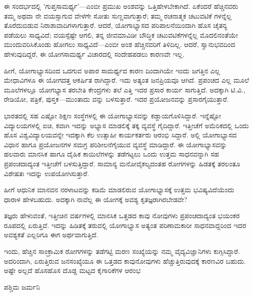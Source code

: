 ಈ ಸಂದರ್ಭದಲ್ಲಿ 'ಗುಪ್ತಸಾಮರ್ಥ್ಯ'—ಎಂಬೀ ಪ್ರಮುಖ ಅಂಶವನ್ನು ಒತ್ತಿಹೇಳಬೇಕಾಗಿದೆ. ಏಕೆಂದರೆ ಹೆಚ್ಚಿನವರು ತಮ್ಮ  ಅಥವಾ  ನೇ ವಯಸ್ಸಾಗುವ ವೇಳೆಗೇ ಸೋತು ಸುಣ್ಣವಾಗುತ್ತಾರೆ; ತಮ್ಮ ರಚನಾತ್ಮಕ ಚಟುವಟಿಕೆ ಗಳನ್ನೆಲ್ಲ ತೊರೆದುಬಿಡುವ ನಿರಾಶಾವಾದಿಗಳಾಗುತ್ತಾರೆ. ಆದರೆ, ಯೋಗಾಭ್ಯಾಸದ ಪರಿಪಾಲನೆಯಿಂದಾಗಿ ಹೊಸ ಚೈತನ್ಯ ಪಡೆಯಲು ಸಾಧ್ಯವಿದೆ; ವಯಸ್ಸೆಷ್ಟೇ ಆಗಲಿ, ತನ್ನ ಜೀವಮಾವಿಡೀ ಬೌದ್ಧಿಕ ಚಟುವಟಿಕೆಗಳನ್ನೆಲ್ಲ ಮೊದಲಿನಂತೆಯೇ ಮುಂದುವರಿಸಿಕೊಂಡು ಹೋಗಲು ಸಾಧ್ಯವಿದೆ—ಎಂಬೀ ಅಂಶ ಹೆಚ್ಚಿನವರಿಗೆ ತಿಳಿದಿಲ್ಲ. ಆದರೆ, ಸ್ವಾನುಭವದಿಂದ ಹೇಳುವುದಿದ್ದರೆ, ಈ ಯೋಗಸಾಮರ್ಥ್ಯ ವಿಚಾರದಲ್ಲಿ ಸಂದೇಹಪಡಲು ಕಾರಣವೇ ಇಲ್ಲ.

ಹೀಗೆ, ಯೋಗಾಭ್ಯಾಸದಿಂದ ಒದಗುವ ಅಪಾರ ಸಾಮರ್ಥ್ಯದ ಕಾರಣ ದಿಂದಾಗಿಯೇ ಇಂದು ಜಗತ್ತಿನ ಎಲ್ಲ ಮೇಧಾವಿಗಳೂ ಈ ಯೋಗದತ್ತ ಆಕರ್ಷಿತ ರಾಗಿದ್ದಾರೆ. ಇದು ಅತ್ಯಂತ ಜನಪ್ರಿಯವೂ ಆಗಿದೆ. ಪ್ರಪಂಚದ ಎಲ್ಲ ಮೂಲೆ ಮೂಲೆಗಳಲ್ಲೂ ಯೋಗಭ್ಯಾಸ ತರಬೇತಿ ಕೇಂದ್ರಗಳು ತಲೆ ಎತ್ತಿ ಇದರ ಪ್ರಸಾರ ಕಾರ್ಯ ಸಾಗುತ್ತಿದೆ. ಅದಕ್ಕಾಗಿ ಟಿ.ವಿ., ರೇಡಿಯೋ, ಪತ್ರಿಕೆ, ಪುಸ್ತಕ—ಮುಂತಾದು ವನ್ನು ಬಳಸುತ್ತಾರೆ. ಇದರ ಪ್ರಯೋಜನವನ್ನು ಪ್ರಸಾರಗೈಯುತ್ತಾರೆ.

ಭಾರತದಲ್ಲಿ ಸಹ ಎಷ್ಟೋ ಶಿಕ್ಷಣ ಸಂಸ್ಥೆಗಳಲ್ಲಿ ಈ ಯೋಗಾಭ್ಯಾಸವನ್ನು ಕಡ್ಡಾಯಗೊಳಿಸಿದ್ದಾರೆ. ಇನ್ನೆಷ್ಟೋ ವಿದ್ಯಾಲಯಗಳಲ್ಲಿ ಐಚಿ, ಕವಾಗಿ ಇದನ್ನು ಅಭ್ಯಾಸ ಮಾಡಲಿಕ್ಕೆ ತಕ್ಕ ವ್ಯವಸ್ಥೆ ಗೈದಿದ್ದಾರೆ. ಇತ್ತೀಚೆಗೆ ಅಮೆರಿಕದಲ್ಲಿ ಒಂದು ಹೊಸ ವಿಶ್ವವಿದ್ಯಾಲಯವನ್ನೇ ಇದಕ್ಕಾಗಿ ಕೆಲ ಉತ್ಸಾಹೀ ಕಾರ್ಯಕರ್ತರು ಆರಂಭಿ ಸಿದ್ದಾರೆ. ಅಲ್ಲಿ ಯೋಗಾಭ್ಯಾಸದ ವಿಧಾನ ಹಾಗೂ ಪ್ರಯೋಜನಗಳ ಸಮಗ್ರ ಪರಿಶೀಲನೆಗೈಯುವ ವ್ಯವಸ್ಥೆ ಮಾಡಿದ್ದಾರೆ. ಈ ಯೋಗಾಭ್ಯಾಸವನ್ನು ಹಲವಾರು ಮಾನಸಿಕ ಹಾಗೂ ದೈಹಿಕ ಕಾಯಿಲೆಗಳನ್ನು ತಡೆಗಟ್ಟಲು ಒಂದು ಉತ್ತಮ ಸಾಧನವನ್ನಾಗಿ ಸಹ ಪ್ರಪಂಚದಾದ್ಯಂತ ಇತ್ತೀಚೆಗೆ ಬಳಸುತ್ತಿದ್ದಾರೆ. ಸಾಮಾನ್ಯ ಮನೋವೈಕಲ್ಯದಂತಹ  ರೋಗಗಳನ್ನು ಹಿಡತಕ್ಕೆ ತರಲಂತೂ ವಿಶೇಷತಃ ಇದನ್ನು ಉಪಯೋಗಿಸುತ್ತಾರೆ.

ಹೀಗೆ ಆಧುನಿಕ ಮಾನವನ ನರಳಾಟವನ್ನು ಕಡಿಮೆ ಮಾಡಲಿರುವ ಯೋಗಾಭ್ಯಾಸಕ್ಕೆ ಉತ್ತಮ ಭವಿಷ್ಯವಿದೆಯೆಂದು ಧಾರಾಳ ಹೇಳಬಹುದು. ಅದಕ್ಕಾಗಿ ನಾವೆಲ್ಲ ಈ ಯೋಗಕ್ಕೆ ಅವಶ್ಯ ಕೃತಜ್ಞರಾಗಿರಬೇಡವೇ?

ತಜ್ಞರು ಹೇಳುವಂತೆ, ಇತ್ತೀಚಿನ ವರ್ಷಗಳಲ್ಲಿ ಮಾನಸಿಕ ಒತ್ತಡದ ಕಾವು ನೋವುಗಳು ಪ್ರಪಂಚದಾದ್ಯಂತ ಭಯಂಕರ ರೂಪದಲ್ಲಿ ಏರುತ್ತಿವೆ. ಇದನ್ನು ಹಿಡಿತಕ್ಕೆ ತರುವಲ್ಲಿ ಯೋಗಾಭ್ಯಾಸ ಅತ್ಯಂತ ಪರಿಣಾಮಕಾರೀ ಸಾಧನವಾದ್ದರಿಂದ ಇದರ ಅವಶ್ಯಕತೆ ಎಲ್ಲರಿಗೂ ಈಗ ಅರ್ಥವಾಗುತ್ತಿದೆ.

ಇಂದು, ಹೆಚ್ಚಿನ ಸಾಂಕ್ರಾಮಿಕ ರೋಗಗಳನ್ನು ತಡೆಗಟ್ಟಿ ಮರಣ ಸಂಖ್ಯೆಯನ್ನು ನಮ್ಮ ವೈದ್ಯವಿಜ್ಞಾನಿಗಳು ಕುಗ್ಗಿಸಿದ್ದಾರೆ. ಅದರಿಂದಾಗಿ, ಏರುತ್ತಿರುವ ಜನ\enginline{}ಸಂಖ್ಯೆಯೂ ಈ ಒತ್ತಡದ ಕಾವುನೋವುಗಳು ಹೆಚ್ಚುತ್ತಿರುವುದಕ್ಕೆ ಕಾರಣವಿರ ಬಹುದು. ಅಷ್ಟೇ ಅಲ್ಲದೆ ಹೊಸಹೊಸ ದೊಡ್ಡ ಮಟ್ಟದ ಕೈಗಾರಿಕೆಗಳ ಆರಂಭ

\begin{center}
ಪಶ್ಚಿಮ ಜರ್ಮನಿ
\end{center}



